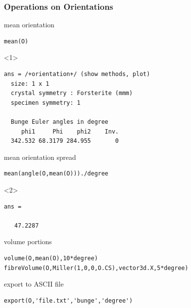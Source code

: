 \documentclass[compress]{beamer}
\begin{document}
\begin{frame}[fragile]
  \frametitle{Operations on Orientations}




mean orientation
  \begin{lstlisting}[style=input]
mean(O)
  \end{lstlisting}

  \begin{onlyenv}<1>
    \begin{lstlisting}[style=output]
ans = /+orientation+/ (show methods, plot)
  size: 1 x 1
  crystal symmetry : Forsterite (mmm)
  specimen symmetry: 1

  Bunge Euler angles in degree
     phi1     Phi    phi2    Inv.
  342.532 68.3179 284.955       0
    \end{lstlisting}
  \end{onlyenv}

\pause
\medskip

  mean orientation spread
  \begin{lstlisting}[style=input]
mean(angle(O,mean(O)))./degree
  \end{lstlisting}

  \begin{onlyenv}<2>
    \begin{lstlisting}[style=output]
ans =

   47.2287
\end{lstlisting}
  \end{onlyenv}

\pause
\medskip

volume portions
\begin{lstlisting}[style=input]
volume(O,mean(O),10*degree)
fibreVolume(O,Miller(1,0,0,O.CS),vector3d.X,5*degree)
\end{lstlisting}

\pause
\medskip

export to ASCII file
\begin{lstlisting}[style=input]
export(O,'file.txt','bunge','degree')
\end{lstlisting}

\end{frame}
\end{document}
